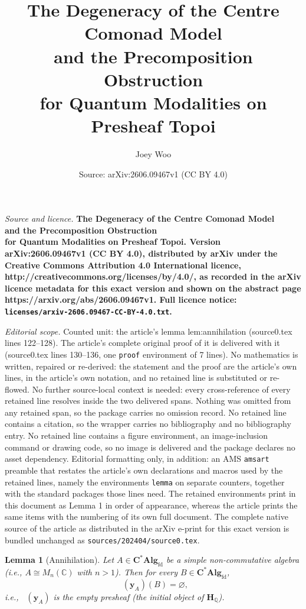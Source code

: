 \documentclass[10pt,a4paper]{amsart}
\title{\Large\bfseries The Degeneracy of the Centre Comonad Model\\ and the Precomposition Obstruction\\ for Quantum Modalities on Presheaf Topoi}
\author{Joey Woo}
\date{Source: arXiv:2606.09467v1 (CC BY 4.0)}
\newtheorem{lemma}{Lemma}
\newcommand{\CAlgfd}{\mathbf{C}^{*}\mathbf{Alg}_{\mathrm{fd}}}
\newcommand{\Htopos}{\mathbf{H}_{\mathbb{Q}}}
\DeclareMathOperator{\Qpot}{Q^{\diamond}}
\begin{document}
\maketitle

\noindent\emph{Source and licence.} \Large\bfseries The Degeneracy of the Centre Comonad Model\\ and the Precomposition Obstruction\\ for Quantum Modalities on Presheaf Topoi. Version arXiv:2606.09467v1 (CC BY 4.0), distributed by arXiv under the Creative Commons Attribution 4.0 International licence, http://creativecommons.org/licenses/by/4.0/, as recorded in the arXiv licence metadata for this exact version and shown on the abstract page https://arxiv.org/abs/2606.09467v1. Full licence notice: \texttt{licenses/arxiv-2606.09467-CC-BY-4.0.txt}.\par\smallskip

\noindent\textit{Editorial scope.} Counted unit: the article's lemma lem:annihilation (source0.tex lines 122--128). The article's complete original proof of it is delivered with it (source0.tex lines 130--136, one \texttt{proof} environment of 7 lines). No mathematics is written, repaired or re-derived: the statement and the proof are the article's own lines, in the article's own notation, and no retained line is substituted or re-flowed.  No further source-local context is needed: every cross-reference of every retained line resolves inside the two delivered spans.  Nothing was omitted from any retained span, so the package carries no omission record.  No retained line contains a citation, so the wrapper carries no bibliography and no bibliography entry.  No retained line contains a figure environment, an image-inclusion command or drawing code, so no image is delivered and the package declares no asset dependency.  Editorial formatting only, in addition: an AMS \texttt{amsart} preamble that restates the article's own declarations and macros used by the retained lines, namely the environments \texttt{lemma} on separate counters, together with the standard packages those lines need.  The retained environments print in this document as Lemma 1 in order of appearance, whereas the article prints the same items with the numbering of its own full document.  The complete native source of the article as distributed in the arXiv e-print for this exact version is bundled unchanged as \texttt{sources/202404/source0.tex}.
\begin{lemma}[Annihilation]\label{lem:annihilation}
Let \(A\in\CAlgfd\) be a simple non‑commutative algebra (i.e., \(A \cong M_n(\mathbb{C})\) with \(n>1\)).  Then for every \(B\in\CAlgfd\),
\[
\Qpot(\mathbf{y}_A)(B) = \varnothing,
\]
i.e., \(\Qpot(\mathbf{y}_A)\) is the empty presheaf (the initial object of \(\Htopos\)).
\end{lemma}
\end{document}

